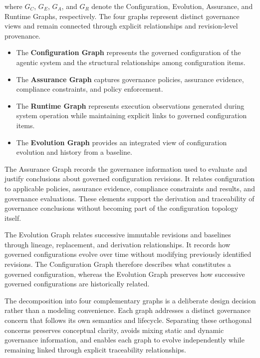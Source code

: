 \documentclass[10pt]{article}
\begin{document}
where $G_C$, $G_E$, $G_A$, and $G_R$ denote the Configuration, Evolution, Assurance, and Runtime Graphs, respectively. The four graphs represent distinct governance views and remain connected through explicit relationships and revision-level provenance.

\begin{itemize}

\item The \textbf{Configuration Graph} represents the governed configuration of the agentic system and the structural relationships among configuration items.

\item The \textbf{Assurance Graph} captures governance policies, assurance evidence, compliance constraints, and policy enforcement.

\item The \textbf{Runtime Graph} represents execution observations generated during system operation while maintaining explicit links to governed configuration items.

\item The \textbf{Evolution Graph} provides an integrated view of configuration evolution and history from a baseline.

\end{itemize}

The Assurance Graph records the governance information used to evaluate and
justify conclusions about governed configuration revisions. It relates
configuration to applicable policies, assurance evidence, compliance
constraints and results, and governance evaluations. These elements support
the derivation and traceability of governance conclusions without becoming
part of the configuration topology itself.

The Evolution Graph relates successive immutable revisions and baselines through
lineage, replacement, and derivation relationships. It records how governed
configurations evolve over time without modifying previously identified
revisions. The Configuration Graph therefore describes what constitutes a
governed configuration, whereas the Evolution Graph preserves how successive
governed configurations are historically related.

The decomposition into four complementary graphs is a deliberate design decision rather than a modeling convenience. Each graph addresses a distinct governance concern that follows its own semantics and lifecycle. Separating these orthogonal concerns preserves conceptual clarity, avoids mixing static and dynamic governance information, and enables each graph to evolve independently while remaining linked through explicit traceability relationships. 
\end{document}
